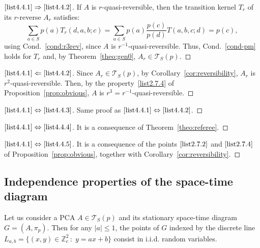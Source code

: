 \documentclass[AHL,Unicode,longabstracts]{cedram}
\newcounter{a}
\newcommand{\Cond}{Cond.}
\newcommand{\triang}[2]{\mathcal{T}_{#1} \left(#2 \right)}
\newcommand{\triangE}[1]{\mathcal{T}_{#1}}
\newcommand{\Z}{\mathbb{Z}}
\begin{document}
\begin{proofc}
\begin{proof}[$\eqref{list4.4.1} \Rightarrow \eqref{list4.4.2}$] If $A$ is $r$-quasi-reversible, then the transition kernel $T_r$ of its $r$-reverse $A_r$ satisfies:
\[
\sum_{a\in S} p(a) T_r(d,a,b;c) = \sum_{a\in S} p(a)\frac{p(c)}{p(d)}T(a,b,c;d) = p(c),
\]
using \Cond~\ref{cond:r3rev}, since $A$ is $r^{-1}$-quasi-reversible. Thus, \Cond~\ref{cond-pm} holds for $T_r$ and, by Theorem~\ref{theo:gen0}, $A_r \in \triang{S}{p}$.
\let\qed\relax
\end{proof}
\begin{proof}[$\eqref{list4.4.1} \Leftarrow \eqref{list4.4.2}$] Since $A_r \in \triang{S}{p}$, by Corollary~\ref{cor:reversibility}, $A_r$ is $r^2$-quasi-reversible. Then, by the property~\eqref{list2.7.4}  of Proposition~\ref{prop:obvious}, $A$ is $r^3=r^{-1}$-quasi-reversible.
\let\qed\relax
\end{proof}
\begin{proof}[$\eqref{list4.4.1} \Leftrightarrow \eqref{list4.4.3}$] Same proof as $\eqref{list4.4.1} \Leftrightarrow \eqref{list4.4.2}$.
\let\qed\relax
\end{proof}
\begin{proof}[$\eqref{list4.4.1} \Leftrightarrow \eqref{list4.4.4}$] It is a consequence of Theorem~\ref{theo:referee}.
\let\qed\relax
\end{proof}
\begin{proof}[$\eqref{list4.4.1} \Leftrightarrow \eqref{list4.4.5}$] It is a consequence of the points $\eqref{list2.7.2}$ and $\eqref{list2.7.4}$ of Proposition~\ref{prop:obvious}, together with Corollary~\ref{cor:reversibility}.
\end{proof}
\let\qed\relax
\end{proofc}

\subsection{Independence properties of the space-time diagram} \label{sec:ind}

\begin{theo}\label{theo:iid_lines}
Let us consider a PCA $A \in \triangE{S}(p)$ and its stationary space-time diagram $G=(A,\pi_p)$. Then for any $|a|\leq 1$, the points of $G$ indexed by the discrete line $L_{a,b}=\{(x,y)\in \Z_{e}^2 \, : \; y=ax+b\}$ consist in i.i.d. random variables.
\end{theo}
\end{document}
